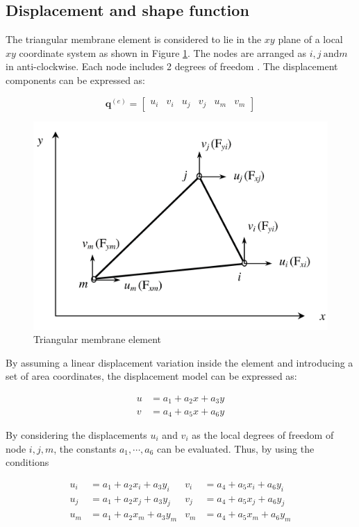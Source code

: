 \subsection{Displacement and shape function}
The triangular membrane element is considered to lie in the $ xy $ plane of a local $ xy $ coordinate system as shown in Figure \ref{fig: triangular membrane element}. The nodes are arranged as $ i,j~\mathrm{and} m $ in anti-clockwise. Each node includes 2 degrees of freedom . The displacement components can be expressed as:

\begin{equation}
\mathbf{q}^{(e)} = 
\begin{bmatrix}
u_i & v_i & u_j & v_j & u_m & v_m
\end{bmatrix} 
\end{equation}

\begin{figure}[h!]
	\centering
	\includegraphics[width=0.5\linewidth]{figure/triangular_membrane_element}
	\caption{Triangular membrane element}
	\label{fig: triangular membrane element}
\end{figure}

By assuming a linear displacement variation inside the element and introducing a set of area coordinates, the displacement model can be expressed as:

\begin{equation} \label{eq: displacement model for CST}
\begin{split}
u &= a_1 + a_2 x + a_3 y \\
v &= a_4 + a_5 x + a_6 y
\end{split}
\end{equation}

By considering the displacements $ u_i $ and $ v_i $ as the local degrees of freedom of node $ i,j,m $, the constants $ a_1, \cdots, a_6 $ can be evaluated. Thus, by using the conditions

\begin{align*}
	u_i &= a_1 + a_2 x_i + a_3 y_i & v_i &= a_4 + a_5 x_i + a_6 y_i \\
	u_j &= a_1 + a_2 x_j + a_3 y_j & v_j &= a_4 + a_5 x_j + a_6 y_j \\
	u_m &= a_1 + a_2 x_m + a_3 y_m & v_m &= a_4 + a_5 x_m + a_6 y_m
\end{align*}

